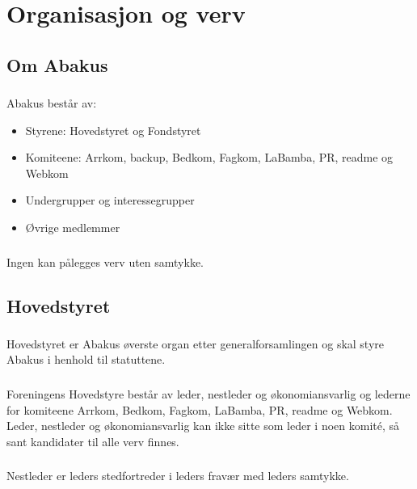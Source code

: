 \section{Organisasjon og verv}
\subsection{Om Abakus}

\subsubsection{}
Abakus består av:

\begin{itemize}
\item Styrene: Hovedstyret og Fondstyret
\item Komiteene: Arrkom, backup, Bedkom, Fagkom, LaBamba, PR, readme og Webkom
\item Undergrupper og interessegrupper
\item Øvrige medlemmer
\end{itemize}

\subsubsection{}
Ingen kan pålegges verv uten samtykke.

\subsection{Hovedstyret}

\subsubsection{}
Hovedstyret er Abakus øverste organ etter generalforsamlingen og skal styre
Abakus i henhold til statuttene.

\subsubsection{}
Foreningens Hovedstyre består av leder, nestleder og økonomiansvarlig og
lederne for komiteene Arrkom, Bedkom, Fagkom, LaBamba, PR, readme og Webkom.
Leder, nestleder og økonomiansvarlig kan ikke sitte som leder i noen komité, så
sant kandidater til alle verv finnes.

\subsubsection{}
Nestleder er leders stedfortreder i leders fravær med leders samtykke.

